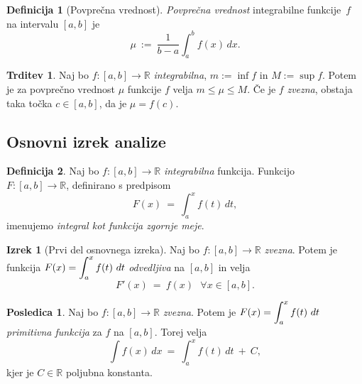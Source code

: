 \documentclass[11pt]{article}
\theoremstyle{definition}
\newtheorem{definicija}{Definicija}[section]
\theoremstyle{definition}
\newtheorem{trditev}{Trditev}[section]
\theoremstyle{definition}
\newtheorem{izrek}{Izrek}[section]
\theoremstyle{theorem}
\newtheorem*{posledica}{Posledica}
\begin{document}
\begin{definicija}[Povprečna vrednost]

\textit{Povprečna vrednost} integrabilne \hbox{funkcije $f$} na intervalu $[a, b]$ je 
$$\mu ~:=~ \frac{1}{b-a} \int_{a}^{b} f(x)\,dx.$$

\end{definicija}
\vspace{0.5cm}

\begin{trditev}

Naj bo $f:[a, b] \rightarrow \mathbb{R}$ \textit{integrabilna}, $m := \inf{f}$ in $M := \sup{f}$. Potem je za povprečno vrednost $\mu$ funkcije $f$ velja $m \leq \mu \leq M$. Če je $f$ \textit{zvezna}, obstaja taka točka $c \in [a, b]$, da je $\mu = f(c)$.

\end{trditev}
\vspace{0.5cm}


\subsection{Osnovni izrek analize}
\vspace{0.5cm}

\begin{definicija}

Naj bo $f:[a, b] \rightarrow \mathbb{R}$ \textit{integrabilna} funkcija. Funkcijo \\$F:[a, b] \rightarrow \mathbb{R}$, definirano s predpisom
$$F(x) ~=~ \int_{a}^{x} f(t)\,dt,$$
imenujemo \textit{integral kot funkcija zgornje meje}.

\end{definicija}
\vspace{0.5cm}

\begin{izrek}[Prvi del osnovnega izreka]

Naj bo $f:[a, b] \rightarrow \mathbb{R}$ \textit{zvezna}. Potem je funkcija $F(x) = \mathlarger{\int_a^x f(t)~dt}$ \textit{odvedljiva} na $[a, b]$ in velja
$$F'(x) ~=~ f(x) ~~~ \forall x \in [a, b].$$

\end{izrek}
\vspace{0.5cm}

\begin{posledica}

Naj bo $f:[a, b] \rightarrow \mathbb{R}$ \textit{zvezna}. Potem je $F(x) = \mathlarger{\int_a^x f(t)~dt}$ \textit{primitivna funkcija} za $f$ na $[a, b]$. Torej velja
$$\int f(x)\,dx ~=~ \int_a^x f(t)\,dt ~+~ C,$$
kjer je $C \in \mathbb{R}$ poljubna konstanta.

\end{posledica}
\vspace{0.5cm}
\end{document}
